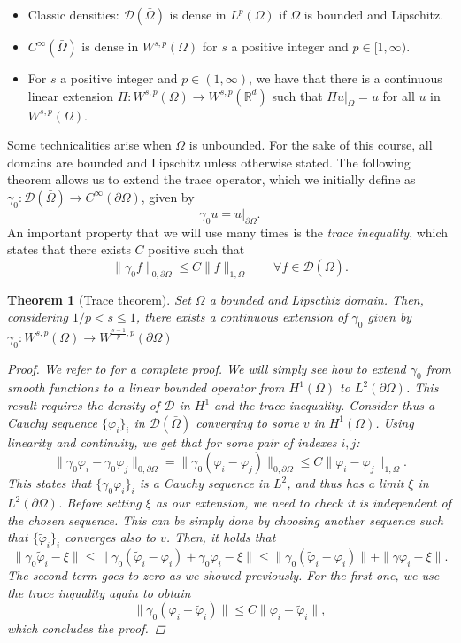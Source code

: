 \documentclass{article}
\newcommand{\R}{\mathbb{R}}
\newcommand{\D}{\mathcal{D}}
\newtheorem{theorem}{Theorem}
\begin{document}
\begin{itemize}
    \item Classic densities: $\D(\bar\Omega)$ is dense in $L^p(\Omega)$ if $\Omega$ is bounded and Lipschitz.
    \item $C^\infty(\bar\Omega)$ is dense in $W^{s,p}(\Omega)$ for $s$ a positive integer and $p\in [1,\infty)$.
    \item For $s$ a positive integer and $p\in (1,\infty)$, we have that there is a continuous linear extension $\Pi: W^{s,p}(\Omega) \to W^{s,p}(\R^d)$ such that $\Pi u|_\Omega = u$ for all $u$ in $W^{s,p}(\Omega)$.
\end{itemize}

Some technicalities arise when $\Omega$ is unbounded. For the sake of this course, all domains are bounded and Lipschitz unless otherwise stated. The following theorem allows us to extend the trace operator, which we initially define as $\gamma_0: \D(\bar\Omega) \to C^\infty(\partial\Omega)$, given by
    $$ \gamma_0 u = u|_{\partial\Omega}.$$
An important property that we will use many times is the \emph{trace inequality}, which states that there exists $C$ positive such that 
    $$ \| \gamma_0 f \|_{0,\partial\Omega} \leq C \| f \|_{1,\Omega} \qquad\forall f \in \mathcal D(\bar\Omega). $$

\begin{theorem}[Trace theorem]\label{thm:trace-theorem}
    Set $\Omega$ a bounded and Lipscthiz domain. Then, considering $1/p < s \leq 1$, there exists a continuous extension of $\gamma_0$ given by $\gamma_0: W^{s,p}(\Omega) \to W^{\frac{s-1}{p}, p}(\partial\Omega)$
    \begin{proof}
        We refer to \cite{adams2003sobolev} for a complete proof. We will simply see how to extend $\gamma_0$ from smooth functions to a linear bounded operator from $H^1(\Omega)$ to $L^2(\partial\Omega)$. This result requires the density of $\mathcal D$ in $H^1$ and the trace inequality. Consider thus a Cauchy sequence $\{\varphi_i\}_i$ in $\mathcal D(\bar\Omega)$ converging to some $v$ in $H^1(\Omega)$. Using linearity and continuity, we get that for some pair of indexes $i,j$: 
        $$ \| \gamma_0 \varphi_i - \gamma_0 \varphi_j \|_{0,\partial\Omega} = \| \gamma_0 (\varphi_i - \varphi_j) \|_{0,\partial\Omega} \leq C \| \varphi_i - \varphi_j \|_{1,\Omega}. $$
        This states that $\{ \gamma_0 \varphi_i \}_i $ is a Cauchy sequence in $L^2$, and thus has a limit $\xi$ in $L^2(\partial\Omega)$. Before setting $\xi$ as our extension, we need to check it is independent of the chosen sequence. This can be simply done by choosing another sequence such that $\{\tilde \varphi_i\}_i$ converges also to $v$. Then, it holds that 
        $$ \| \gamma_0 \tilde \varphi_i - \xi \| \leq \| \gamma_0(\tilde\varphi_i - \varphi_i) + \gamma_0 \varphi_i - \xi \| \leq \| \gamma_0(\tilde\varphi_i - \varphi_i) \| + \| \gamma\varphi_i - \xi \|. $$
        The second term goes to zero as we showed previously. For the first one, we use the trace inquality again to obtain 
        $$ \| \gamma_0(\varphi_i - \tilde\varphi_i) \| \leq C \|\varphi_i - \tilde \varphi_i \|, $$
        which concludes the proof. 
    \end{proof}
\end{theorem}
\end{document}
